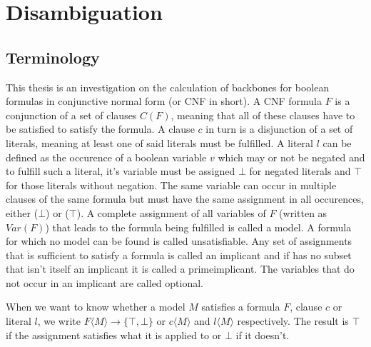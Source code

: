 \section{Disambiguation}
\subsection{Terminology}
This thesis is an investigation on the calculation of backbones for boolean formulas in conjunctive normal form (or CNF in short). A CNF formula $F$ is a conjunction of a set of clauses $C(F)$, meaning that all of these clauses have to be satisfied to satisfy the formula. A clause $c$ in turn is a disjunction of a set of literals, meaning at least one of said literals must be fulfilled. A literal $l$ can be defined as the occurence of a boolean variable $v$ which may or not be negated and to fulfill such a literal, it's variable must be assigned $\bot$ for negated literals and $\top$ for those literals without negation. The same variable can occur in multiple clauses of the same formula but must have the same assignment in all occurences, either ($\bot$) or ($\top$). A complete assignment of all variables of $F$ (written as $Var(F)$) that leads to the formula being fulfilled is called a model. A formula for which no model can be found is called unsatisfiable. Any set of assignments that is sufficient to satisfy a formula is called an implicant and if has no subset that isn't itself an implicant it is called a primeimplicant. The variables that do not occur in an implicant are called optional.


When we want to know whether a model $M$ satisfies a formula $F$, clause $c$ or literal $l$, we write $F\langle M\rangle \rightarrow \{\top,\bot\}$ or $c\langle M\rangle$ and $l\langle M\rangle$ respectively. The result is $\top$ if the assignment satisfies what it is applied to or $\bot$ if it doesn't.

